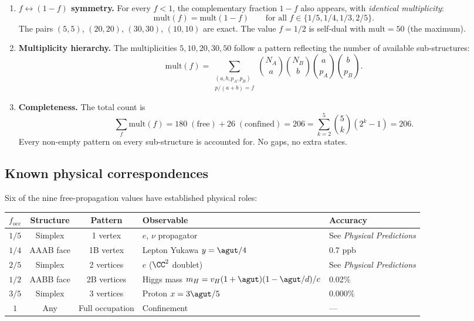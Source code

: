 \begin{enumerate}
\item \textbf{$f \leftrightarrow (1-f)$ symmetry.}  For every $f < 1$, the complementary fraction $1 - f$ also appears, with \emph{identical multiplicity}:
\begin{equation}
\mathrm{mult}(f) = \mathrm{mult}(1 - f) \qquad \text{for all } f \in \{1/5, 1/4, 1/3, 2/5\}.
\end{equation}
The pairs $(5, 5)$, $(20, 20)$, $(30, 30)$, $(10, 10)$ are exact.  The value $f = 1/2$ is self-dual with $\mathrm{mult} = 50$ (the maximum).

\item \textbf{Multiplicity hierarchy.}  The multiplicities $5, 10, 20, 30, 50$ follow a pattern reflecting the number of available sub-structures:
\begin{equation}
\mathrm{mult}(f) = \sum_{\substack{(a,b,p_A,p_B) \\ p/(a+b) = f}} \binom{N_A}{a}\binom{N_B}{b}\binom{a}{p_A}\binom{b}{p_B}.
\end{equation}

\item \textbf{Completeness.}  The total count is
\begin{equation}
\sum_f \mathrm{mult}(f) = 180\;(\text{free}) + 26\;(\text{confined}) = 206 = \sum_{k=2}^{5} \binom{5}{k}(2^k - 1) = 206.
\end{equation}
Every non-empty pattern on every sub-structure is accounted for.  No gaps, no extra states.
\end{enumerate}

\subsection{Known physical correspondences}
\label{sec:known_correspondences}

Six of the nine free-propagation values have established physical roles:

\begin{center}
\begin{tabular}{cccll}
\hline
$f_\mathrm{occ}$ & Structure & Pattern & Observable & Accuracy \\
\hline
$1/5$ & Simplex & 1 vertex & $e$, $\nu$ propagator & See \textit{Physical Predictions} \\
$1/4$ & AAAB face & 1B vertex & Lepton Yukawa $y = \agut/4$ & 0.7 ppb \\
$2/5$ & Simplex & 2 vertices & $e$ ($\CC^2$ doublet) & See \textit{Physical Predictions} \\
$1/2$ & AABB face & 2B vertices & Higgs mass $m_H = v_H(1+\agut)(1-\agut/d)/c$ & 0.02\% \\
$3/5$ & Simplex & 3 vertices & Proton $x = 3\agut/5$ & 0.000\% \\
$1$   & Any & Full occupation & Confinement & --- \\
\hline
\end{tabular}
\end{center}

